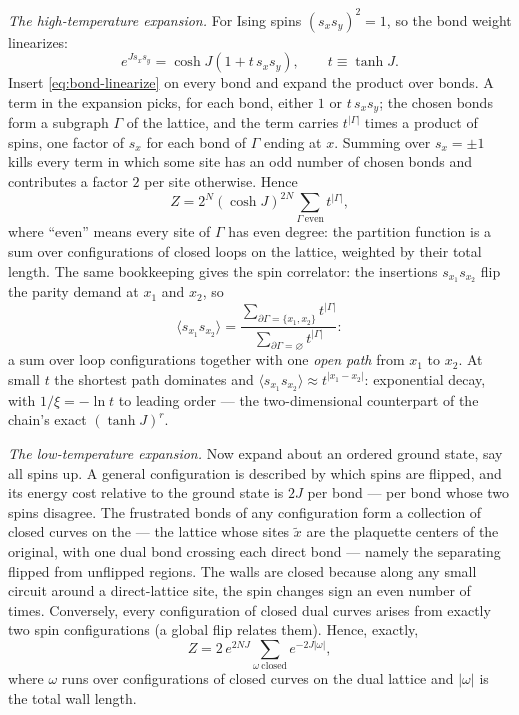 \emph{The high-temperature expansion.} For Ising spins $(s_x s_y)^2 = 1$,
so the bond weight linearizes:
\begin{equation}
e^{J s_x s_y} = \cosh J \left( 1 + t\, s_x s_y \right),
\qquad t \equiv \tanh J .
\label{eq:bond-linearize}
\end{equation}
Insert \eqref{eq:bond-linearize} on every bond and expand the product
over bonds. A term in the expansion picks, for each bond, either $1$ or
$t\,s_x s_y$; the chosen bonds form a subgraph $\Gamma$ of the lattice,
and the term carries $t^{|\Gamma|}$ times a product of spins, one factor
of $s_x$ for each bond of $\Gamma$ ending at $x$. Summing over $s_x = \pm
1$ kills every term in which some site has an odd number of chosen bonds
and contributes a factor $2$ per site otherwise. Hence
\begin{equation}
Z = 2^N (\cosh J)^{2N} \sum_{\Gamma\ \mathrm{even}} t^{|\Gamma|},
\label{eq:high-T}
\end{equation}
where ``even'' means every site of $\Gamma$ has even degree: the
partition function is a sum over configurations of closed loops on the
lattice, weighted by their total length. The same bookkeeping gives the
spin correlator: the insertions $s_{x_1} s_{x_2}$ flip the parity demand
at $x_1$ and $x_2$, so
\begin{equation}
\langle s_{x_1} s_{x_2} \rangle
= \frac{\displaystyle\sum_{\partial\Gamma = \{x_1, x_2\}} t^{|\Gamma|}}
{\displaystyle\sum_{\partial\Gamma = \varnothing} t^{|\Gamma|}}:
\label{eq:high-T-correlator}
\end{equation}
a sum over loop configurations together with one \emph{open path} from
$x_1$ to $x_2$. At small $t$ the shortest path dominates and
$\langle s_{x_1}s_{x_2}\rangle \approx t^{|x_1 - x_2|}$: exponential
decay, with $1/\xi = -\ln t$ to leading order --- the two-dimensional
counterpart of the chain's exact $(\tanh J)^r$.

\emph{The low-temperature expansion.} Now expand about an ordered ground
state, say all spins up. A general configuration is described by which
spins are flipped, and its energy cost relative to the ground state is
$2J$ per  bond --- per bond whose two spins disagree.
The frustrated bonds of any configuration form a collection of closed
curves on the  --- the lattice whose sites $\tilde x$
are the plaquette centers of the original, with one dual bond crossing
each direct bond --- namely the  separating flipped
from unflipped regions. The walls are closed because along any small
circuit around a direct-lattice site, the spin changes sign an even
number of times. Conversely, every configuration of closed dual curves
arises from exactly two spin configurations (a global flip relates
them). Hence, exactly,
\begin{equation}
Z = 2\, e^{2NJ} \sum_{\omega\ \mathrm{closed}} e^{-2J|\omega|},
\label{eq:low-T}
\end{equation}
where $\omega$ runs over configurations of closed curves on the dual
lattice and $|\omega|$ is the total wall length.

